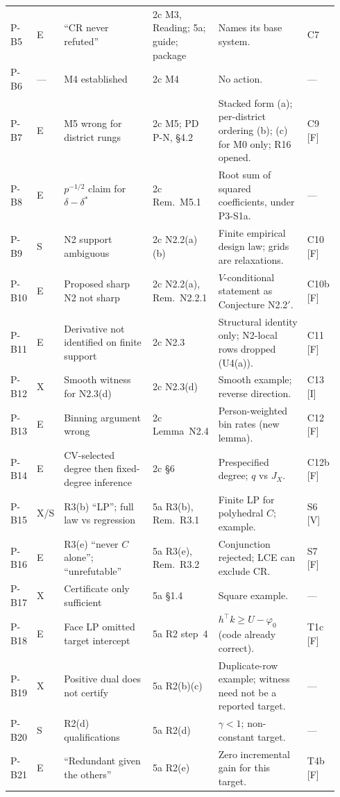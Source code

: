 {\begin{longtable}{@{}L{0.06\linewidth}L{0.03\linewidth}L{0.30\linewidth}L{0.17\linewidth}L{0.30\linewidth}L{0.08\linewidth}@{}}
P-B5 & E & ``CR never refuted'' & 2c M3, Reading; 5a; guide; package & Names its base system. & C7 \\
P-B6 & --- & M4 established & 2c M4 & No action. & --- \\
P-B7 & E & M5 wrong for district rungs & 2c M5; PD P-N, \S4.2 & Stacked form (a); per-district ordering (b); (c) for M0 only; R16 opened. & C9 [F] \\
P-B8 & E & $p^{-1/2}$ claim for $\delta-\delta^*$ & 2c Rem.~M5.1 & Root sum of squared coefficients, under P3-S1a. & --- \\
P-B9 & S & N2 support ambiguous & 2c N2.2(a)(b) & Finite empirical design law; grids are relaxations. & C10 [F] \\
P-B10 & E & Proposed sharp N2 not sharp & 2c N2.2(a), Rem.~N2.2.1 & $V$-conditional statement as Conjecture N2.2$'$. & C10b [F] \\
P-B11 & E & Derivative not identified on finite support & 2c N2.3 & Structural identity only; N2-local rows dropped (U4(a)). & C11 [F] \\
P-B12 & X & Smooth witness for N2.3(d) & 2c N2.3(d) & Smooth example; reverse direction. & C13 [I] \\
P-B13 & E & Binning argument wrong & 2c Lemma~N2.4 & Person-weighted bin rates (new lemma). & C12 [F] \\
P-B14 & E & CV-selected degree then fixed-degree inference & 2c \S6 & Prespecified degree; $q$ vs $J_X$. & C12b [F] \\
P-B15 & X/S & R3(b) ``LP''; full law vs regression & 5a R3(b), Rem.~R3.1 & Finite LP for polyhedral $C$; example. & S6 [V] \\
P-B16 & E & R3(e) ``never $C$ alone''; ``unrefutable'' & 5a R3(e), Rem.~R3.2 & Conjunction rejected; LCE can exclude CR. & S7 [F] \\
P-B17 & X & Certificate only sufficient & 5a \S1.4 & Square example. & --- \\
P-B18 & E & Face LP omitted target intercept & 5a R2 step~4 & $h^\top k\ge U-\varphi_0$ (code already correct). & T1c [F] \\
P-B19 & X & Positive dual does not certify & 5a R2(b)(c) & Duplicate-row example; witness need not be a reported target. & --- \\
P-B20 & S & R2(d) qualifications & 5a R2(d) & $\gamma<1$; non-constant target. & --- \\
P-B21 & E & ``Redundant given the others'' & 5a R2(e) & Zero incremental gain for this target. & T4b [F] \\

\end{longtable}}
